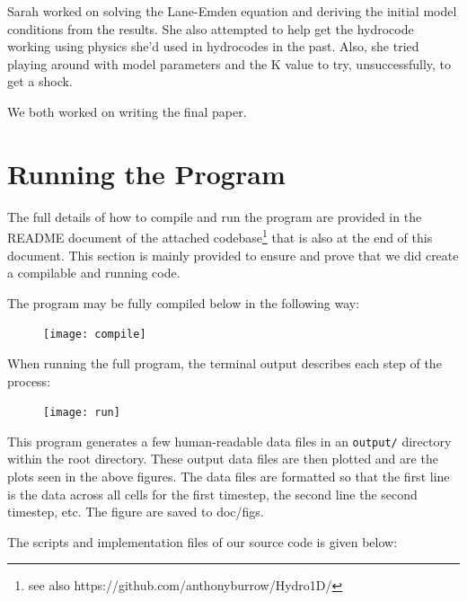 \documentclass[12pt]{article}
\begin{document}
Sarah worked on solving the Lane-Emden equation and deriving the initial model conditions from the results. She also attempted to help get the hydrocode working using physics she'd used in hydrocodes in the past. Also, she tried playing around with model parameters and the K value to try, unsuccessfully, to get a shock.

We both worked on writing the final paper.


\section{Running the Program}

The full details of how to compile and run the program are provided in the README document of the attached
codebase\footnote{see also https://github.com/anthonyburrow/Hydro1D/} that is also at the end of this
document. This section is mainly provided to ensure and prove that we did create a compilable and running code.

The program may be fully compiled below in the following way:
\begin{figure}[H]
    \centering
    \texttt{[image: compile]}
    \label{fig:compile}
\end{figure}
When running the full program, the terminal output describes each step of the process:
\begin{figure}[H]
    \centering
    \texttt{[image: run]}
    \label{fig:run}
\end{figure}

This program generates a few human-readable data files in an \texttt{output/} directory within the
root directory. These output data files are then plotted and are the plots seen in the above figures. The data files are formatted so that the first line is the data across all cells for the first timestep, the second line the second timestep, etc. The figure are saved to doc/figs.



\pagebreak

The scripts and implementation files of our source code is given below:
\end{document}
